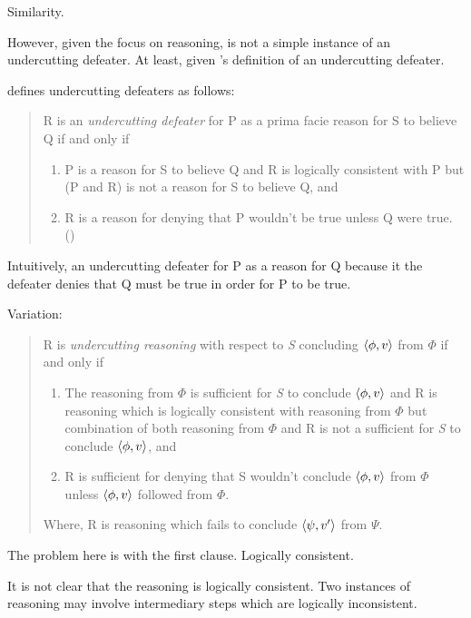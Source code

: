 \begin{note}
  Similarity.

  However, given the focus on reasoning, \requ{} is not a simple instance of an undercutting defeater.
  At least, given \citeauthor{Pollock:1987un}'s definition of an undercutting defeater.

  \citeauthor{Pollock:1987un} defines undercutting defeaters as follows:
  \begin{quote}
    R is an \emph{undercutting defeater} for P as a prima facie reason for S to believe Q if and only if
    \begin{enumerate}[label=(UD\arabic*), ref=(UD\arabic*)]
    \item
      P is a reason for S to believe Q and R is logically consistent with P but (P and R) is not a reason for S to believe Q, and
    \item
      R is a reason for denying that P wouldn't be true unless Q were true.%
      \mbox{}\hfill\mbox{(\citeyear[485]{Pollock:1987un})}
    \end{enumerate}
  \end{quote}
  Intuitively, an undercutting defeater for P as a reason for Q because it the defeater denies that Q must be true in order for P to be true.

  Variation:
  \begin{quote}
    R is \emph{undercutting reasoning} with respect to \emph{S} concluding \(\langle \phi, v \rangle\) from \(\Phi\) if and only if
    \begin{enumerate}[label=(UR\arabic*), ref=(UR\arabic*)]
    \item
      The reasoning from \(\Phi\) is sufficient for \emph{S} to conclude \(\langle \phi, v \rangle\) and R is reasoning which is logically consistent with reasoning from \(\Phi\) but combination of both reasoning from \(\Phi\) and R is not a sufficient for \emph{S} to conclude \(\langle \phi, v \rangle\), and
    \item
      R is sufficient for denying that S wouldn't conclude \(\langle \phi, v \rangle\) from \(\Phi\) unless \(\langle \phi, v \rangle\) followed from \(\Phi\).%
    \end{enumerate}
    Where, R is reasoning which fails to conclude \(\langle \psi, v' \rangle\) from \(\Psi\).
  \end{quote}

  The problem here is with the first clause.
  Logically consistent.

  It is not clear that the reasoning is logically consistent.
  Two instances of reasoning may involve intermediary steps which are logically inconsistent.


\end{note}
